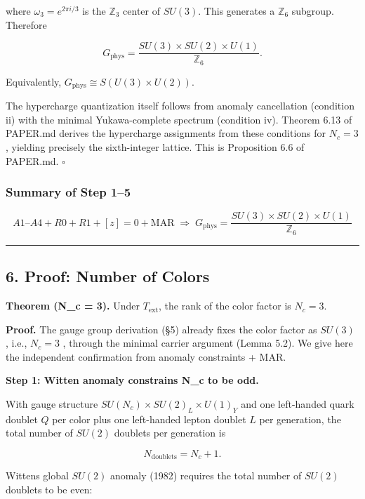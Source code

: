 where \(\omega_3 = e^{2\pi i/3}\) is the \(\mathbb{Z}_3\) center of \(SU(3)\). This generates a \(\mathbb{Z}_6\) subgroup. Therefore

\[G_{\mathrm{phys}} = \frac{SU(3) \times SU(2) \times U(1)}{\mathbb{Z}_6}.\]

Equivalently, \(G_{\mathrm{phys}} \cong S(U(3) \times U(2))\).

The hypercharge quantization itself follows from anomaly cancellation (condition ii) with the minimal Yukawa-complete spectrum (condition iv). Theorem 6.13 of PAPER.md derives the hypercharge assignments from these conditions for \(N_c = 3\), yielding precisely the sixth-integer lattice. This is Proposition 6.6 of PAPER.md. \(\square\)

\subsubsection{Summary of Step 1--5}\label{summary-of-step-15}

\[\boxed{A1\text{–}A4 + R0 + R1 + [z]=0 + \mathrm{MAR} \;\Longrightarrow\; G_{\mathrm{phys}} = \frac{SU(3) \times SU(2) \times U(1)}{\mathbb{Z}_6}}\]

\begin{center}\rule{0.5\linewidth}{0.5pt}\end{center}

\subsection{6. Proof: Number of Colors}\label{6-proof-number-of-colors}

\textbf{Theorem (N\_c = 3).} Under \(T_{\mathrm{ext}}\), the rank of the color factor is \(N_c = 3\).

\textbf{Proof.} The gauge group derivation (§5) already fixes the color factor as \(SU(3)\) , i.e., \(N_c = 3\) , through the minimal carrier argument (Lemma 5.2). We give here the independent confirmation from anomaly constraints + MAR.

\textbf{Step 1: Witten anomaly constrains N\_c to be odd.}

With gauge structure \(SU(N_c) \times SU(2)_L \times U(1)_Y\) and one left-handed quark doublet \(Q\) per color plus one left-handed lepton doublet \(L\) per generation, the total number of \(SU(2)\) doublets per generation is

\[N_{\mathrm{doublets}} = N_c + 1.\]

Witten\textquotesingle s global \(SU(2)\) anomaly (1982) requires the total number of \(SU(2)\) doublets to be even:

